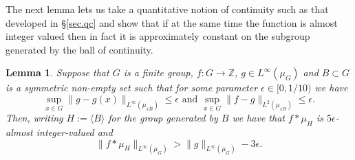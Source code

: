 \documentclass[12pt]{amsart}
\numberwithin{equation}{section}
\theoremstyle{plain}
\newtheorem{lemma}[subsection]{Lemma}
\theoremstyle{definition}
\renewcommand{\leq}{\leqslant}
\newcommand{\Z}{\mathbb{Z}}
\begin{document}
The next lemma lets us take a quantitative notion of continuity such as that developed in \S\ref{sec.qc} and show that if at the same time the function is almost integer valued then in fact it is approximately constant on the subgroup generated by the ball of continuity.
\begin{lemma}\label{lem.spread}
Suppose that $G$ is a finite group, $f:G \rightarrow \Z$, $g \in L^\infty(\mu_G)$ and $B \subset G$ is a symmetric non-empty set such that for some parameter $\epsilon \in [0,1/10)$ we have
\begin{equation*}
\sup_{x \in G}{\|g-g(x)\|_{L^\infty(\mu_{xB})}} \leq \epsilon \textrm{ and } \sup_{x \in G}{\|f-g\|_{L^2(\mu_{xB})}} \leq \epsilon.
\end{equation*}
Then, writing $H:=\langle B \rangle$ for the group generated by $B$ we have that $f \ast \mu_H$ is $5\epsilon$-almost integer-valued and
\begin{equation*}
\|f \ast \mu_H\|_{L^\infty(\mu_G)} > \|g\|_{L^\infty(\mu_G)} - 3\epsilon.
\end{equation*}
\end{lemma}
\end{document}
